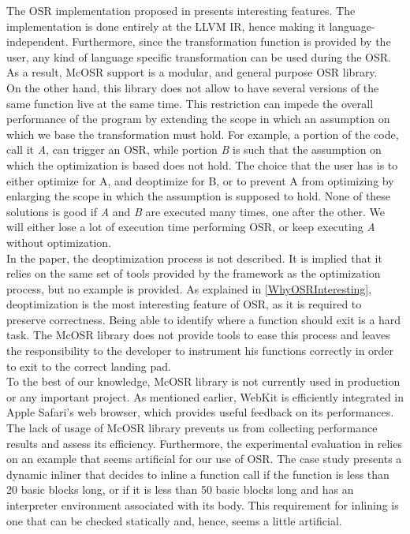 The OSR implementation proposed in\cite{lameed2013modular} presents interesting features.
The implementation is done entirely at the LLVM IR, hence making it language-independent.
Furthermore, since the transformation function is provided by the user, any kind of language specific transformation can be used during the OSR.
As a result, McOSR support is a modular, and general purpose OSR library.\\

On the other hand, this library does not allow to have several versions of the same function live at the same time.
This restriction can impede the overall performance of the program by extending the scope in which an assumption on which we base the transformation must hold.
For example, a portion of the code, call it \textit{A}, can trigger an OSR, while portion \textit{B} is such that the assumption on which the optimization is based does not hold.
The choice that the user has is to either optimize for A, and deoptimize for B, or to prevent A from optimizing by enlarging the scope in which the assumption is supposed to hold.
None of these solutions is good if \textit{A} and \textit{B} are executed many times, one after the other.
We will either lose a lot of execution time performing OSR, or keep executing \textit{A} without optimization.\\

In the paper, the deoptimization process is not described. 
It is implied that it relies on the same set of tools provided by the framework as the optimization process, but no example is provided.
As explained in \ref{WhyOSRInteresting}, deoptimization is the most interesting feature of OSR, as it is required to preserve correctness.
Being able to identify where a function should exit is a hard task.
The McOSR library does not provide tools to ease this process and leaves the responsibility to the developer to instrument his functions correctly in order to exit to the correct landing pad.\\

To the best of our knowledge, McOSR library is not currently used in production or any important project.
As mentioned earlier, WebKit is efficiently integrated in Apple Safari's web browser, which provides useful feedback on its performances.
The lack of usage of McOSR library prevents us from collecting performance results and assess its efficiency.
Furthermore, the experimental evaluation in\cite{lameed2013modular} relies on an example that seems artificial for our use of OSR. 
The case study presents a dynamic inliner that decides to inline a function call if the function is less than 20 basic blocks long, or if it is less than 50 basic blocks long and has an interpreter environment associated with its body. 
This requirement for inlining is one that can be checked statically and, hence, seems a little artificial.\\

